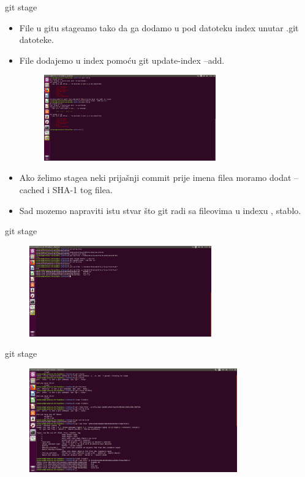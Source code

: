 \documentclass{beamer}
\begin{document}
\begin{frame}{git stage}

\begin{itemize}
	\item File u gitu stageamo tako da ga dodamo u pod datoteku index unutar .git datoteke.
	\item File dodajemo u index pomoću git update-index --add.
	\begin{figure}
		\centering
	\includegraphics[width=0.7\textwidth]{./slike/cetvrta_slika.png}
	\end{figure}
	\item Ako želimo stagea neki prijašnji commit prije imena filea moramo dodat --cached i SHA-1 tog filea.
	\item Sad mozemo napraviti istu stvar što git radi sa fileovima u indexu , stablo.
	
		
\end{itemize}


\end{frame}
\begin{frame}{git stage}
	\begin{figure}
		\centering
	\includegraphics[width=0.7\textwidth]{./slike/peta_slika.png}
	\end{figure}
\end{frame}

\begin{frame}{git stage}
	\begin{figure}
		\centering
	\includegraphics[width=0.8\textwidth]{./slike/sesta_slika.png}
	\end{figure}


\end{frame}
\end{document}
